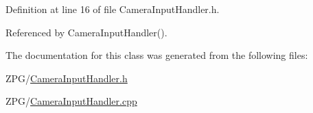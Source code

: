 Definition at line 16 of file Camera\+Input\+Handler.\+h.



Referenced by Camera\+Input\+Handler().



The documentation for this class was generated from the following files\+:\begin{DoxyCompactItemize}
\item 
Z\+P\+G/\mbox{\hyperlink{CameraInputHandler_8h}{Camera\+Input\+Handler.\+h}}\item 
Z\+P\+G/\mbox{\hyperlink{CameraInputHandler_8cpp}{Camera\+Input\+Handler.\+cpp}}\end{DoxyCompactItemize}
